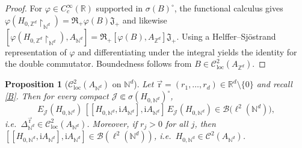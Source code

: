 \documentclass[10pt]{amsart}
\newcommand{\R}{{\mathbb{R}}}
\newcommand{\Z}{{\mathbb{Z}}}
\newcommand{\N}{{\mathbb{N}}}
\newcommand{\1}{{\mathbb{I}}}
\newcommand{\Bc}{\mathcal{B}}
\newcommand{\Jc}{\mathcal{J}}
\numberwithin{equation}{section}
\newtheorem{proposition}[theorem]{Proposition}%
\begin{document}
\begin{proof}
For $\varphi\in C_c^\infty(\R)$ supported in $\sigma(B)^\circ$, the functional calculus gives
$\varphi(H_{0,\Z^d}\!\restriction_{\N^d})=\mathfrak{R}_+\varphi(B)\mathfrak{J}_+$ and likewise
$[\varphi(H_{0,\Z^d}\!\restriction_{\N^d}),A_{\N^d}]=\mathfrak{R}_+[\varphi(B),A_{\Z^d}]\mathfrak{J}_+$.
Using a Helffer--Sjöstrand representation of $\varphi$ and differentiating under the integral yields the identity for the double commutator. Boundedness follows from $B\in\mathcal{C}^2_{\mathrm{loc}}(A_{\Z^d})$.
\end{proof}
\begin{proposition}[$\mathcal{C}^2_{\mathrm{loc}}(A_{\N^d})$ on $\N^d$]\label{prop:C2-joint-Nd}
Let $\vec{\mathrm{r}}=(r_1,\dots,r_d)\in\R^d\setminus\{0\}$ and recall \eqref{B}.
Then for every compact $\Jc\Subset \sigma(H_{0,\N^d})^\circ$,
\[
E_\Jc(H_{0,\N^d})\,[[H_{0,\N^d},\mathrm{i}A_{\N^d}],\mathrm{i}A_{\N^d}]\,E_\Jc(H_{0,\N^d})\in\Bc\big(\ell^2(\N^d)\big),
\]
i.e.\ $\Delta^{\vec{\mathrm{r}}}_{\N^d}\in \mathcal{C}^2_{\mathrm{loc}}(A_{\N^d})$.
Moreover, if $r_j>0$ for all $j$, then $[[H_{0,\N^d},\mathrm{i}A_{\N^d}],\mathrm{i}A_{\N^d}]\in\Bc(\ell^2(\N^d))$, i.e.\ $H_{0,\N^d}\in\mathcal{C}^2(A_{\N^d})$.
\end{proposition}
\end{document}
